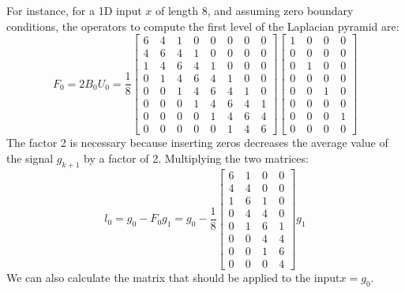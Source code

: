 For instance, for a 1D input $x$ of length 8, and assuming zero boundary conditions, the operators to compute the first level of the Laplacian pyramid are:
\begin{equation}
	F_0 =  2 B_0 U_0 =
	\frac{1}{8}
	\begin{bmatrix}
		6 ~ & 4 ~ & 1 ~ & 0 ~ & 0 ~ & 0 ~ & 0 ~ & 0 \\
		4 ~ & 6 ~ & 4 ~ & 1 ~ & 0 ~ & 0 ~ & 0 ~ & 0 \\
		1 ~ & 4 ~ & 6 ~ & 4 ~ & 1 ~ & 0 ~ & 0 ~ & 0 \\
		0 ~ & 1 ~ & 4 ~ & 6 ~ & 4 ~ & 1 ~ & 0 ~ & 0 \\
		0 ~ & 0 ~ & 1 ~ & 4 ~ & 6 ~ & 4 ~ & 1 ~ & 0 \\
		0 ~ & 0 ~ & 0 ~ & 1 ~ & 4 ~ & 6 ~ & 4 ~ & 1 \\
		0 ~ & 0 ~ & 0 ~ & 0 ~ & 1 ~ & 4 ~ & 6 ~ & 4 \\
		0 ~ & 0 ~ & 0 ~ & 0 ~ & 0 ~ & 1 ~ & 4 ~ & 6
	\end{bmatrix}
	\begin{bmatrix}
		1 ~ & 0 ~ & 0  ~ & 0 \\
		0 ~ & 0 ~ & 0  ~ & 0 \\
		0 ~ & 1 ~ & 0  ~ & 0 \\
		0 ~ & 0 ~ & 0  ~ & 0 \\
		0 ~ & 0 ~ & 1  ~ & 0 \\
		0 ~ & 0 ~ & 0  ~ & 0 \\
		0 ~ & 0 ~ & 0  ~ & 1 \\
		0 ~ & 0 ~ & 0  ~ & 0
	\end{bmatrix}
\end{equation}
The factor 2 is necessary because inserting zeros decreases the average value of the signal $g_{k+1}$ by a factor of 2. Multiplying the two matrices:
\begin{equation}
	l_{0} = g_0 - F_0 g_{1} =
	g_0 - \frac{1}{8}
	\begin{bmatrix}
		6 ~ & 1 ~ & 0  ~ & 0 \\
		4 ~ & 4 ~ & 0  ~ & 0 \\
		1 ~ & 6 ~ & 1  ~ & 0 \\
		0 ~ & 4 ~ & 4  ~ & 0 \\
		0 ~ & 1 ~ & 6  ~ & 1 \\
		0 ~ & 0 ~ & 4  ~ & 4 \\
		0 ~ & 0 ~ & 1  ~ & 6 \\
		0 ~ & 0 ~ & 0  ~ & 4
	\end{bmatrix}
	g_{1}
\end{equation}
We can also calculate the matrix that should be applied to the input$x=g_0$.
